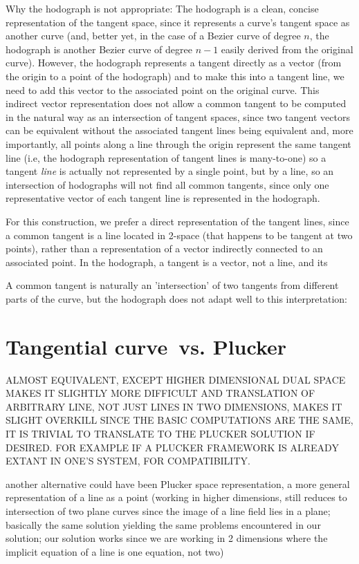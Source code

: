 \documentclass[11pt]{article}
\newcommand{\Tang}{Tangential curve\ }
\begin{document}
Why the hodograph is not appropriate:
The hodograph is a clean, concise representation of the tangent space,
since it represents a curve's tangent space as another curve
(and, better yet, in the case of a Bezier curve of degree $n$, the hodograph 
is another Bezier curve of degree $n-1$ easily derived from the original curve).
However, the hodograph represents a tangent directly as a vector (from the origin to a point
of the hodograph) and to make this into a tangent line, we need to
add this vector to the associated point on the original curve.
This indirect vector representation does not allow a common tangent to 
be computed in the natural way as an intersection of tangent spaces,
since two tangent vectors can be equivalent without the associated tangent
lines being equivalent and, more importantly, all points along a line 
through the origin represent the same tangent line (i.e, the hodograph
representation of tangent lines is many-to-one) so a tangent {\em line}
is actually not represented by a single point, but by a line,
so an intersection of hodographs will not find all common tangents,
since only one representative vector of each tangent line is represented
in the hodograph.

For this construction, we prefer a direct representation of the tangent lines,
since a common tangent is a line located in 2-space
(that happens to be tangent at two points),
rather than a representation of a vector indirectly connected to an associated point.
In the hodograph, a tangent is a vector, not a line, and its 

A common tangent is naturally an 'intersection' of two tangents from 
different parts of the curve, but the hodograph does not adapt well
to this interpretation:

\section{\Tang vs. Plucker}
\label{sec:plucker}

ALMOST EQUIVALENT, EXCEPT HIGHER DIMENSIONAL DUAL SPACE MAKES IT SLIGHTLY
	MORE DIFFICULT AND TRANSLATION OF 
	ARBITRARY LINE, NOT JUST LINES IN TWO DIMENSIONS, MAKES IT SLIGHT OVERKILL
	SINCE THE BASIC COMPUTATIONS ARE THE SAME, IT IS TRIVIAL
	TO TRANSLATE TO THE PLUCKER SOLUTION IF DESIRED.
	FOR EXAMPLE IF A PLUCKER FRAMEWORK IS ALREADY EXTANT IN ONE'S SYSTEM,
	FOR COMPATIBILITY.

another alternative could have been Plucker space representation,
	a more general representation of a line as a point
	(working in higher dimensions, 
	still reduces to intersection of two plane curves
	since the image of a line field lies in a plane;
	basically the same solution yielding the same problems encountered
	in our solution;
	our solution works since we are working in 2 dimensions
	where the implicit equation of a line is one equation, not two)
\end{document}
